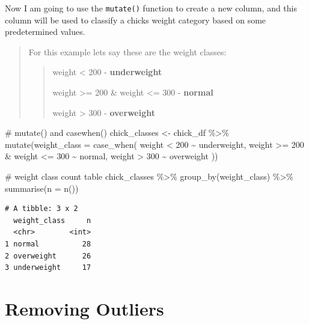 \documentclass[
  letterpaper,
  DIV=11,
  numbers=noendperiod]{scrreprt}
\newenvironment{Shaded}{\begin{snugshade}}{\end{snugshade}}
\newcommand{\AttributeTok}[1]{\textcolor[rgb]{0.40,0.45,0.13}{#1}}
\newcommand{\CommentTok}[1]{\textcolor[rgb]{0.37,0.37,0.37}{#1}}
\newcommand{\DecValTok}[1]{\textcolor[rgb]{0.68,0.00,0.00}{#1}}
\newcommand{\FunctionTok}[1]{\textcolor[rgb]{0.28,0.35,0.67}{#1}}
\newcommand{\NormalTok}[1]{\textcolor[rgb]{0.00,0.23,0.31}{#1}}
\newcommand{\OtherTok}[1]{\textcolor[rgb]{0.00,0.23,0.31}{#1}}
\newcommand{\SpecialCharTok}[1]{\textcolor[rgb]{0.37,0.37,0.37}{#1}}
\newcommand{\StringTok}[1]{\textcolor[rgb]{0.13,0.47,0.30}{#1}}
\begin{document}
Now I am going to use the \texttt{mutate()} function to create a new
column, and this column will be used to classify a chicks weight
category based on some predetermined values.

\begin{quote}
For this example lets say these are the weight classes:

\begin{quote}
weight \textless{} 200 - \textbf{underweight}

weight \textgreater= 200 \& weight \textless= 300 - \textbf{normal}

weight \textgreater{} 300 - \textbf{overweight}
\end{quote}
\end{quote}

\begin{Shaded}
\begin{Highlighting}[]
\CommentTok{\# mutate() and casewhen()}
\NormalTok{chick\_classes }\OtherTok{\textless{}{-}}\NormalTok{ chick\_df }\SpecialCharTok{\%\textgreater{}\%}
  \FunctionTok{mutate}\NormalTok{(}\AttributeTok{weight\_class =} \FunctionTok{case\_when}\NormalTok{(}
\NormalTok{    weight }\SpecialCharTok{\textless{}} \DecValTok{200} \SpecialCharTok{\textasciitilde{}} \StringTok{\textquotesingle{}underweight\textquotesingle{}}\NormalTok{,}
\NormalTok{    weight }\SpecialCharTok{\textgreater{}=} \DecValTok{200} \SpecialCharTok{\&}\NormalTok{ weight }\SpecialCharTok{\textless{}=} \DecValTok{300} \SpecialCharTok{\textasciitilde{}} \StringTok{\textquotesingle{}normal\textquotesingle{}}\NormalTok{,}
\NormalTok{    weight }\SpecialCharTok{\textgreater{}} \DecValTok{300} \SpecialCharTok{\textasciitilde{}} \StringTok{\textquotesingle{}overweight\textquotesingle{}}
\NormalTok{    ))}

\CommentTok{\# weight class count table }
\NormalTok{chick\_classes }\SpecialCharTok{\%\textgreater{}\%} 
  \FunctionTok{group\_by}\NormalTok{(weight\_class) }\SpecialCharTok{\%\textgreater{}\%}
  \FunctionTok{summarise}\NormalTok{(}\AttributeTok{n =} \FunctionTok{n}\NormalTok{())}
\end{Highlighting}
\end{Shaded}

\begin{verbatim}
# A tibble: 3 x 2
  weight_class     n
  <chr>        <int>
1 normal          28
2 overweight      26
3 underweight     17
\end{verbatim}

\hypertarget{removing-outliers}{%
\section{\texorpdfstring{\textbf{Removing
Outliers}}{Removing Outliers}}\label{removing-outliers}}
\end{document}

